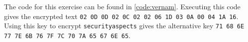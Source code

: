 
The code for this exercise can be found in \autoref{code:vernam}. Executing this code gives the encrypted text \texttt{02 0D 0D 02 0C 02 02 06 1D 03 0A 00 04 1A 16}. Using this key to encrypt \texttt{securityaspects} gives the alternative key \texttt{71 68 6E 77 7E 6B 76 7F 7C 70 7A 65 67 6E 65}.

